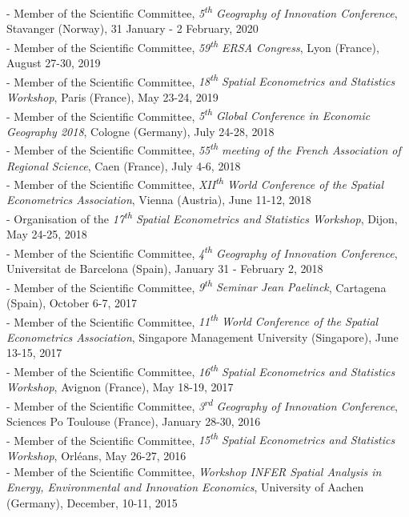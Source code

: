 \documentclass[a4paper,12pt]{article}
\begin{document}
- Member of the Scientific Committee, \textit{5\textsuperscript{th} Geography of Innovation Conference}, Stavanger (Norway), 31 January - 2 February, 2020 \\
- Member of the Scientific Committee, \textit{59\textsuperscript{th} ERSA Congress}, Lyon (France), August 27-30, 2019 \\
- Member of the Scientific Committee, \textit{18\textsuperscript{th} Spatial Econometrics and Statistics Workshop}, Paris (France), May 23-24, 2019 \\
- Member of the Scientific Committee, \textit{5\textsuperscript{th} Global Conference in Economic Geography 2018}, Cologne (Germany), July 24-28, 2018 \\
- Member of the Scientific Committee, \textit{55\textsuperscript{th} meeting of the French Association of Regional Science}, Caen (France), July 4-6, 2018 \\
- Member of the Scientific Committee, \textit{XII\textsuperscript{th} World Conference of the Spatial Econometrics Association}, Vienna (Austria), June 11-12, 2018 \\
- Organisation of the \textit{17\textsuperscript{th} Spatial Econometrics and Statistics Workshop}, Dijon, May 24-25, 2018 \\
- Member of the Scientific Committee, \textit{4\textsuperscript{th} Geography of Innovation Conference}, Universitat de Barcelona (Spain), January 31 - February 2, 2018 \\
- Member of the Scientific Committee, \textit{9\textsuperscript{th} Seminar Jean Paelinck}, Cartagena (Spain), October 6-7, 2017 \\
- Member of the Scientific Committee, \textit{11\textsuperscript{th} World Conference of the Spatial Econometrics Association}, Singapore Management University (Singapore), June 13-15, 2017 \\
- Member of the Scientific Committee, \textit{16\textsuperscript{th} Spatial Econometrics and Statistics Workshop}, Avignon (France), May 18-19, 2017 \\
- Member of the Scientific Committee, \textit{3\textsuperscript{rd} Geography of Innovation Conference}, Sciences Po Toulouse (France), January 28-30, 2016 \\
- Member of the Scientific Committee, \textit{15\textsuperscript{th} Spatial Econometrics and Statistics Workshop}, Orléans, May 26-27, 2016 \\
- Member of the Scientific Committee, \textit{Workshop INFER Spatial Analysis in Energy, Environmental and Innovation Economics}, University of Aachen (Germany), December, 10-11, 2015 \\
\end{document}
